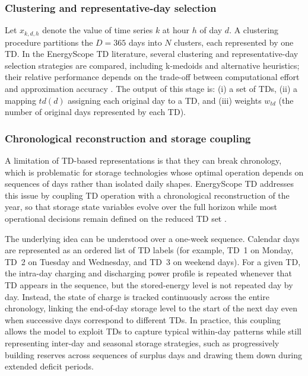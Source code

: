 \documentclass{article}
\begin{document}
\newpage

\subsubsection{Clustering and representative-day selection}
Let $x_{k,d,h}$ denote the value of time series $k$ at hour $h$ of day $d$. A clustering procedure partitions the $D=365$ days into $N$ clusters, each represented by one TD. In the EnergyScope TD literature, several clustering and representative-day selection strategies are compared, including k-medoids and alternative heuristics; their relative performance depends on the trade-off between computational effort and approximation accuracy \citep{limpensGeneratingEnergyTransition2021,thiranExploringOptionsFossilfree2025}. The output of this stage is:
(i) a set of TDs,
(ii) a mapping $td(d)$ assigning each original day to a TD, and
(iii) weights $w_{td}$ (the number of original days represented by each TD).

\subsubsection{Chronological reconstruction and storage coupling}
A limitation of TD-based representations is that they can break chronology, which is problematic for storage technologies whose optimal operation depends on sequences of days rather than isolated daily shapes. EnergyScope TD addresses this issue by coupling TD operation with a chronological reconstruction of the year, so that storage state variables evolve over the full horizon while most operational decisions remain defined on the reduced TD set \citep{dominguez-munoz_selection_2011,limpensEnergyScopeTDNovel2019}.

The underlying idea can be understood over a one-week sequence. Calendar days are represented as an ordered list of TD labels (for example, TD~1 on Monday, TD~2 on Tuesday and Wednesday, and TD~3 on weekend days). For a given TD, the intra-day charging and discharging power profile is repeated whenever that TD appears in the sequence, but the stored-energy level is not repeated day by day. Instead, the state of charge is tracked continuously across the entire chronology, linking the end-of-day storage level to the start of the next day even when successive days correspond to different TDs. In practice, this coupling allows the model to exploit TDs to capture typical within-day patterns while still representing inter-day and seasonal storage strategies, such as progressively building reserves across sequences of surplus days and drawing them down during extended deficit periods.
\end{document}

